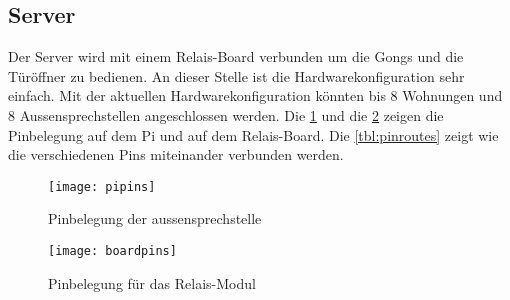 \subsection{Server}
\label{sec:chapterexample}
Der Server wird mit einem Relais-Board verbunden um die Gongs und die Türöffner zu bedienen. An dieser Stelle ist die Hardwarekonfiguration sehr einfach. Mit der aktuellen Hardwarekonfiguration könnten bis 8 Wohnungen und 8 Aussensprechstellen angeschlossen werden. Die \cref{fig:pipins} und die \cref{fig:boardpins} zeigen die Pinbelegung auf dem Pi und auf dem Relais-Board. Die \cref{tbl:pinroutes} zeigt wie die verschiedenen Pins miteinander verbunden werden.

\begin{figure}[htb!]
	\begin{center}
		\texttt{[image: pipins]}
		\caption[EthernetPinbelegung]{Pinbelegung der \gls{aussensprechstelle}}
		\label{fig:pipins}
	\end{center}
\end{figure}

\begin{figure}[htb!]
	\begin{center}
		\texttt{[image: boardpins]}
		\caption[EthernetPinbelegung]{Pinbelegung für das Relais-Modul}
		\label{fig:boardpins}
	\end{center}
\end{figure}

